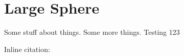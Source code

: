 \chapter{Large Sphere}
\label{LargeSphereChapter}

Some stuff about things.\cite{vienot_verriest_2014} Some more things. 
Testing 123

Inline citation: 

\blindtext
